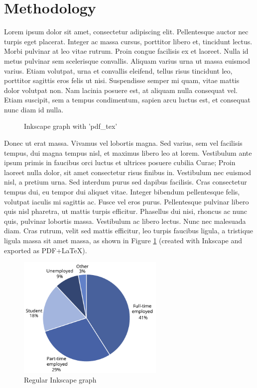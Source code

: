\section{Methodology} \label{methodology}

Lorem ipsum dolor sit amet, consectetur adipiscing elit. Pellentesque auctor nec turpis eget placerat. Integer ac massa cursus, porttitor libero et, tincidunt lectus. Morbi pulvinar at leo vitae rutrum. Proin congue facilisis ex et laoreet. Nulla id metus pulvinar sem scelerisque convallis. Aliquam varius urna ut massa euismod varius. Etiam volutpat, urna et convallis eleifend, tellus risus tincidunt leo, porttitor sagittis eros felis ut nisi. Suspendisse semper mi quam, vitae mattis dolor volutpat non. Nam lacinia posuere est, at aliquam nulla consequat vel. Etiam suscipit, sem a tempus condimentum, sapien arcu luctus est, et consequat nunc diam id nulla.

\begin{figure} [h]
\centering
\def\svgwidth{0.6\columnwidth}

\caption{Inkscape graph with 'pdf\_tex'}
\label{fig:graph-inkscape-tex}
\end{figure}

Donec ut erat massa. Vivamus vel lobortis magna. Sed varius, sem vel facilisis tempus, dui magna tempus nisl, et maximus libero leo at lorem. Vestibulum ante ipsum primis in faucibus orci luctus et ultrices posuere cubilia Curae; Proin laoreet nulla dolor, sit amet consectetur risus finibus in. Vestibulum nec euismod nisl, a pretium urna. Sed interdum purus sed dapibus facilisis. Cras consectetur tempus dui, eu tempor dui aliquet vitae. Integer bibendum pellentesque felis, volutpat iaculis mi sagittis ac. Fusce vel eros purus. Pellentesque pulvinar libero quis nisl pharetra, ut mattis turpis efficitur. Phasellus dui nisi, rhoncus ac nunc quis, pulvinar lobortis massa. Vestibulum ac libero lectus. Nunc nec malesuada diam. Cras rutrum, velit sed mattis efficitur, leo turpis faucibus ligula, a tristique ligula massa sit amet massa, as shown in Figure \ref{fig:graph-inkscape-tex} (created with Inkscape and exported as PDF+LaTeX).

\begin{figure}[htp]
\centering
\includegraphics[width=7cm]{Figures/Chap-3/pie-chart.pdf}
\caption{Regular Inkscape graph}
\label{fig:graph-inkscape}
\end{figure}

